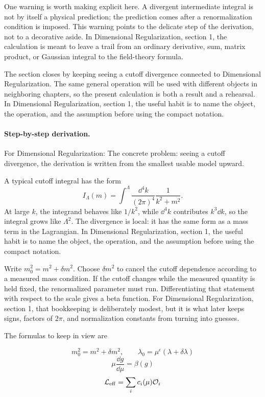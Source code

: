 One warning is worth making explicit here.  A divergent intermediate integral is not by itself a physical prediction; the prediction comes after a renormalization condition is imposed.  This warning points to the delicate step of the derivation, not to a decorative aside.  In Dimensional Regularization, section 1, the calculation is meant to leave a trail from an ordinary derivative, sum, matrix product, or Gaussian integral to the field-theory formula.

The section closes by keeping seeing a cutoff divergence connected to Dimensional Regularization.  The same general operation will be used with different objects in neighboring chapters, so the present calculation is both a result and a rehearsal.  In Dimensional Regularization, section 1, the useful habit is to name the object, the operation, and the assumption before using the compact notation.



\paragraph{Step-by-step derivation.}

For Dimensional Regularization: The concrete problem: seeing a cutoff divergence, the derivation is written from the smallest usable model upward.

A typical cutoff integral has the form
\[
  I_\Lambda(m)=\int^{\Lambda}\frac{\dd^4k}{(2\pi)^4}\frac{1}{k^2+m^2}.
\]
At large \(k\), the integrand behaves like \(1/k^2\), while \(\dd^4k\) contributes \(k^3\dd k\), so the integral grows like \(\Lambda^2\).  The divergence is local: it has the same form as a mass term in the Lagrangian.  In Dimensional Regularization, section 1, the useful habit is to name the object, the operation, and the assumption before using the compact notation.

Write \(m_0^2=m^2+\delta m^2\).  Choose \(\delta m^2\) to cancel the cutoff dependence according to a measured mass condition.  If the cutoff changes while the measured quantity is held fixed, the renormalized parameter must run.  Differentiating that statement with respect to the scale gives a beta function.  For Dimensional Regularization, section 1, that bookkeeping is deliberately modest, but it is what later keeps signs, factors of \(2\pi\), and normalization constants from turning into guesses.

The formulas to keep in view are

\[
  m_0^2=m^2+\delta m^2,\qquad \lambda_0=\mu^\epsilon(\lambda+\delta\lambda)
\]
\[
  \mu\frac{\dd g}{\dd\mu}=\beta(g)
\]
\[
  \mathcal L_{\mathrm{eff}}=\sum_i c_i(\mu)\mathcal O_i
\]

